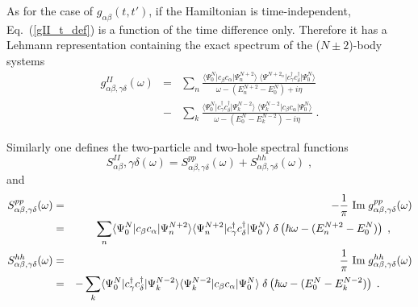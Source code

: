As for the case of $g_{\alpha \beta}(t,t')$, if the Hamiltonian is time-independent, Eq.~(\ref{gII_t_def}) is a function of the time difference only. Therefore it has a Lehmann representation containing the exact spectrum of the ($N\pm2$)-body systems
\begin{eqnarray}
 g^{II}_{\alpha \beta , \gamma \delta}(\omega) &=& 
 \sum_n  \frac{\langle \Psi^N_0 \vert 
                c_\beta c_\alpha \vert \Psi^{N+2}_n \rangle  \;
                 \langle \Psi^{N+2_n} \vert
         c^{\dag}_\gamma c^{\dag}_\delta \vert \Psi^N_0 \rangle }{\omega - ( E^{N+2}_n - E^N_0 ) + i \eta }
\nonumber \\  
&-& \sum_k  \frac{  \langle {\Psi^N_0} \vert 
    c^{\dag}_\gamma c^{\dag}_\delta \vert {\Psi^{N-2}_k} \rangle \;
                 \langle {\Psi^{N-2}_k} \vert 
                  c_\beta c_\alpha \vert {\Psi^N_0} \rangle }
            {\omega - \left( E^N_0 - E^{N-2}_k \right) - i \eta } \; .
\label{eq:gII_Leh}
\end{eqnarray}

Similarly one defines the two-particle and two-hole spectral functions
\begin{equation}
 S^{II}_{\alpha \beta}, \gamma \delta (\omega) =  S^{pp}_{\alpha \beta, \gamma \delta} (\omega) +  S^{hh}_{\alpha \beta, \gamma \delta} (\omega) \; ,
\label{S2_ab} 
\end{equation}
and
\begin{eqnarray}
 S^{pp}_{\alpha \beta, \gamma \delta} (\omega) &=& - \frac{1}{\pi} ~ \hbox{Im} \;g^{pp}_{\alpha \beta, \gamma \delta} (\omega) 
\nonumber \\
            &=&  \sum_n \langle \Psi^N_0     \vert  c_\beta         c_\alpha         \vert \Psi^{N+2}_n \rangle
                        \langle \Psi^{N+2}_n \vert  c^{\dag}_\gamma c^{\dag}_\delta  \vert \Psi^N_0     \rangle
             \; \delta \left( \hbar\omega - (E^{N+2}_n - E^N_0) \right) \; , \qquad
\label{S2pp_ab} \\
 S^{hh}_{\alpha \beta, \gamma \delta} (\omega) &=& ~ \frac{1}{\pi} ~ \hbox{Im} \;g^{hh}_{\alpha \beta, \gamma \delta} (\omega) 
\nonumber  \\
            &=&  - \sum_k \langle \Psi^N_0     \vert  c^{\dag}_\gamma c^{\dag}_\delta \vert \Psi^{N-2}_k  \rangle
                          \langle \Psi^{N-2}_k \vert  c_\beta         c_\alpha        \vert \Psi^N_0 \rangle
             \; \delta \left( \hbar\omega - (E^N_0 - E^{N-2}_k) \right) \; . \qquad \quad
\label{S2hh_ab} 
\end{eqnarray}


